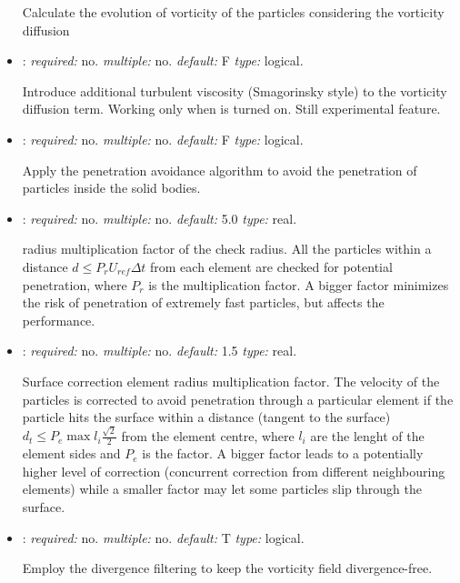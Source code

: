 \begin{itemize}
Calculate the evolution of vorticity of the particles considering the vorticity diffusion

\item {}: \textit{required:} no. \textit{multiple:} no. \textit{default:} F \textit{type:} logical.

Introduce additional turbulent viscosity (Smagorinsky style) to the vorticity diffusion term. Working only when  is turned on. Still experimental feature. 

\item {}: \textit{required:} no. \textit{multiple:} no. \textit{default:} F \textit{type:} logical.

Apply the penetration avoidance algorithm to avoid the penetration of particles inside the solid bodies.

\item {}: \textit{required:} no. \textit{multiple:} no. \textit{default:} 5.0 \textit{type:} real.

radius multiplication factor of the check radius. All the particles within a distance $d\leq P_r U_{ref} \Delta t$ from each element are checked for potential penetration, where $P_r$ is the multiplication factor. A bigger factor minimizes the risk of penetration of extremely fast particles, but affects the performance. 

\item {}: \textit{required:} no. \textit{multiple:} no. \textit{default:} 1.5 \textit{type:} real.

Surface correction element radius multiplication factor.
The velocity of the particles is corrected to avoid penetration through a particular element if the particle hits the surface within a distance (tangent to the surface) $d_t \leq P_e \max{l_i} \frac{\sqrt{2}}{2}$ from the element centre, where $l_i$ are the lenght of the element sides and $P_e$ is the factor. 
A bigger factor leads to a potentially higher level of correction (concurrent correction from different neighbouring elements) while a smaller factor may let some particles slip through the surface. 

\item {}: \textit{required:} no. \textit{multiple:} no. \textit{default:} T \textit{type:} logical.

Employ the divergence filtering to keep the vorticity field divergence-free. 


\end{itemize}
